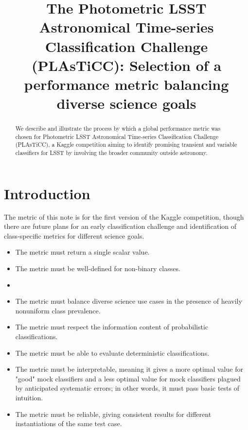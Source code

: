 \documentclass[\docopts]{\docclass}
\begin{document}
\title{The Photometric LSST Astronomical Time-series Classification Challenge (PLAsTiCC): Selection of a performance metric balancing diverse science goals}

\maketitlepre

\begin{abstract}

  We describe and illustrate the process by which a global performance metric was chosen for Photometric LSST Astronomical Time-series Classification Challenge (PLAsTiCC), a Kaggle competition aiming to identify promising transient and variable classifiers for LSST by involving the broader community outside astronomy.

\end{abstract}

\dockeys{}

\maketitlepost


\section{Introduction}
\label{sec:intro}

The metric of this note is for the first version of the Kaggle competition, though there are future plans for an early classification challenge and identification of class-specific metrics for different science goals.

\begin{itemize}
\item    The metric must return a single scalar value.
\item    The metric must be well-defined for non-binary classes.
\item\item    The metric must balance diverse science use cases in the presence of heavily nonuniform class prevalence.
\item    The metric must respect the information content of probabilistic classifications.
\item    The metric must be able to evaluate deterministic classifications.
\item    The metric must be interpretable, meaning it gives a more optimal value for "good" mock classifiers and a less optimal value for mock classifiers plagued by anticipated systematic errors; in other words, it must pass basic tests of intuition.
\item    The metric must be reliable, giving consistent results for different instantiations of the same test case.
\end{itemize}
\end{document}
